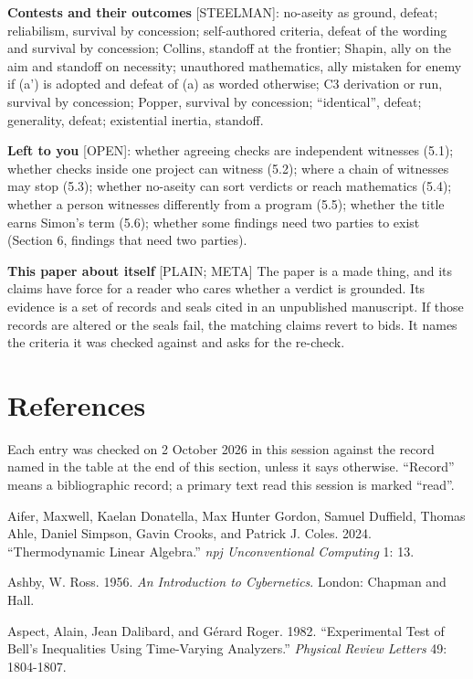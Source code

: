 \documentclass[11pt]{article}
\newcommand{\register}[1]{{\ttfamily\small #1}}
\begin{document}
\textbf{Contests and their outcomes} \register{[STEELMAN]}: no-aseity as ground, defeat; reliabilism, survival by concession; self-authored criteria, defeat of the wording and survival by concession; Collins, standoff at the frontier; Shapin, ally on the aim and standoff on necessity; unauthored mathematics, ally mistaken for enemy if (a') is adopted and defeat of (a) as worded otherwise; C3 derivation or run, survival by concession; Popper, survival by concession; ``identical'', defeat; generality, defeat; existential inertia, standoff.

\textbf{Left to you} \register{[OPEN]}: whether agreeing checks are independent witnesses (5.1); whether checks inside one project can witness (5.2); where a chain of witnesses may stop (5.3); whether no-aseity can sort verdicts or reach mathematics (5.4); whether a person witnesses differently from a program (5.5); whether the title earns Simon's term (5.6); whether some findings need two parties to exist (Section 6, findings that need two parties).

\textbf{This paper about itself} \register{[PLAIN; META]} The paper is a made thing, and its claims have force for a reader who cares whether a verdict is grounded. Its evidence is a set of records and seals cited in an unpublished manuscript. If those records are altered or the seals fail, the matching claims revert to bids. It names the criteria it was checked against and asks for the re-check.

\section*{References}

Each entry was checked on 2 October 2026 in this session against the record named in the table at the end of this section, unless it says otherwise. ``Record'' means a bibliographic record; a primary text read this session is marked ``read''.

Aifer, Maxwell, Kaelan Donatella, Max Hunter Gordon, Samuel Duffield, Thomas Ahle, Daniel Simpson, Gavin Crooks, and Patrick J. Coles. 2024. ``Thermodynamic Linear Algebra.'' \emph{npj Unconventional Computing} 1: 13.

Ashby, W. Ross. 1956. \emph{An Introduction to Cybernetics}. London: Chapman and Hall.

Aspect, Alain, Jean Dalibard, and Gérard Roger. 1982. ``Experimental Test of Bell's Inequalities Using Time-Varying Analyzers.'' \emph{Physical Review Letters} 49: 1804-1807.
\end{document}
